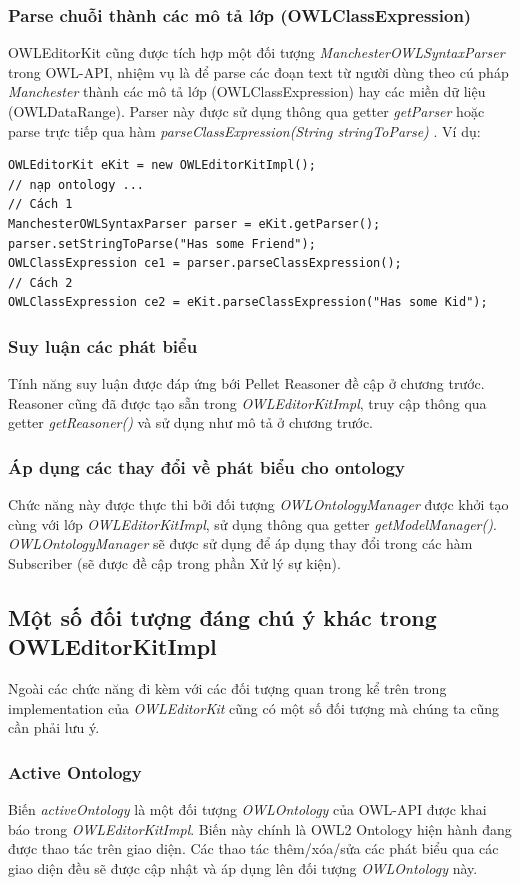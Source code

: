 \subsubsection{Parse chuỗi thành các mô tả lớp (OWLClassExpression)}
OWLEditorKit cũng được tích hợp một đối tượng \textit{ManchesterOWLSyntaxParser} trong OWL-API, nhiệm vụ là để parse các đoạn text từ người dùng theo cú pháp \textit{Manchester} thành các mô tả lớp (OWLClassExpression) hay các miền dữ liệu (OWLDataRange). Parser này được sử dụng thông qua getter \textit{getParser} hoặc parse trực tiếp qua hàm \textit{parseClassExpression(String stringToParse)} . Ví dụ:
\begin{verbatim}
OWLEditorKit eKit = new OWLEditorKitImpl();
// nạp ontology ...
// Cách 1
ManchesterOWLSyntaxParser parser = eKit.getParser();
parser.setStringToParse("Has some Friend");
OWLClassExpression ce1 = parser.parseClassExpression();
// Cách 2 
OWLClassExpression ce2 = eKit.parseClassExpression("Has some Kid");
\end{verbatim}

\subsubsection{Suy luận các phát biểu}
Tính năng suy luận được đáp ứng bới Pellet Reasoner đề cập ở chương trước. Reasoner cũng đã được tạo sẵn trong \textit{OWLEditorKitImpl}, truy cập thông qua getter \textit{getReasoner()} và sử dụng như mô tả ở chương trước.

\subsubsection{Áp dụng các thay đổi về phát biểu cho ontology}
Chức năng này được thực thi bởi đối tượng \textit{OWLOntologyManager} được khởi tạo cùng với lớp \textit{OWLEditorKitImpl}, sử dụng thông qua getter \textit{getModelManager()}.
\textit{OWLOntologyManager} sẽ được sử dụng để áp dụng thay đổi trong các hàm Subscriber (sẽ được đề cập trong phần Xử lý sự kiện).

\subsection{Một số đối tượng đáng chú ý khác trong OWLEditorKitImpl}
Ngoài các chức năng đi kèm với các đối tượng quan trong kể trên trong implementation của \textit{OWLEditorKit} cũng có một số đối tượng mà chúng ta cũng cần phải lưu ý.
\subsubsection{Active Ontology}
Biến  \textit{activeOntology} là một đối tượng \textit{OWLOntology} của OWL-API được khai báo trong \textit{OWLEditorKitImpl}. Biến này chính là OWL2 Ontology hiện hành đang được thao tác trên giao diện. Các thao tác thêm/xóa/sửa các phát biểu qua các giao diện đều sẽ được cập nhật và áp dụng lên đối tượng \textit{OWLOntology} này.

